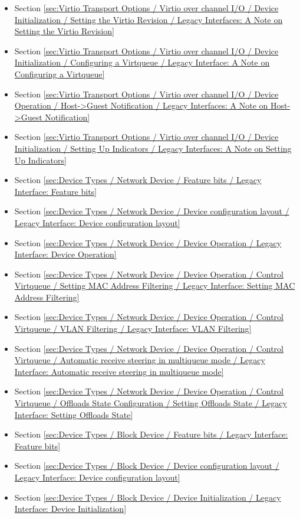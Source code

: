 \begin{itemize}
\item Section \ref{sec:Virtio Transport Options / Virtio over channel I/O / Device Initialization / Setting the Virtio Revision / Legacy Interfaces: A Note on Setting the Virtio Revision}
\item Section \ref{sec:Virtio Transport Options / Virtio over channel I/O / Device Initialization / Configuring a Virtqueue / Legacy Interface: A Note on Configuring a Virtqueue}
\item Section \ref{sec:Virtio Transport Options / Virtio over channel I/O / Device Operation / Host->Guest Notification / Legacy Interfaces: A Note on Host->Guest Notification}
\item Section \ref{sec:Virtio Transport Options / Virtio over channel I/O / Device Initialization / Setting Up Indicators / Legacy Interfaces: A Note on Setting Up Indicators}
\item Section \ref{sec:Device Types / Network Device / Feature bits / Legacy Interface: Feature bits}
\item Section \ref{sec:Device Types / Network Device / Device configuration layout / Legacy Interface: Device configuration layout}
\item Section \ref{sec:Device Types / Network Device / Device Operation / Legacy Interface: Device Operation}
\item Section \ref{sec:Device Types / Network Device / Device Operation / Control Virtqueue / Setting MAC Address Filtering / Legacy Interface: Setting MAC Address Filtering}
\item Section \ref{sec:Device Types / Network Device / Device Operation / Control Virtqueue / VLAN Filtering / Legacy Interface: VLAN Filtering}
\item Section \ref{sec:Device Types / Network Device / Device Operation / Control Virtqueue / Automatic receive steering in multiqueue mode / Legacy Interface: Automatic receive steering in multiqueue mode}
\item Section \ref{sec:Device Types / Network Device / Device Operation / Control Virtqueue / Offloads State Configuration / Setting Offloads State / Legacy Interface: Setting Offloads State}
\item Section \ref{sec:Device Types / Block Device / Feature bits / Legacy Interface: Feature bits}
\item Section \ref{sec:Device Types / Block Device / Device configuration layout / Legacy Interface: Device configuration layout}
\item Section \ref{sec:Device Types / Block Device / Device Initialization / Legacy Interface: Device Initialization}

\end{itemize}
